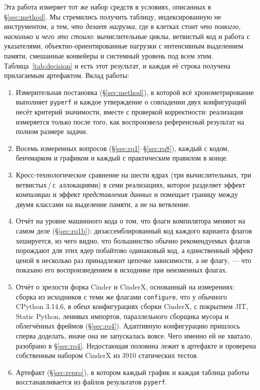 \documentclass[10pt,a4paper]{article}
\newcommand{\code}[1]{\texttt{\small #1}}
\begin{document}
Эта работа измеряет тот же набор средств в условиях, описанных в \S\ref{sec:method}. Мы
стремились получить таблицу, индексированную не инструментом, а тем, \emph{что делает нагрузка},
где в клетках стоит
\emph{что помогло, насколько и чего это стоило}: вычислительные циклы, ветвистый код и работа с
указателями, объектно-ориентированные нагрузки с интенсивным выделением памяти, смешанные
конвейеры и системный уровень под всем этим. Таблица~\ref{tab:decision} и есть этот результат, и
каждая её строка получена прилагаемым артефактом. Вклад работы:

\begin{enumerate}[leftmargin=1.4em,itemsep=1pt]
  \item Измерительная постановка (\S\ref{sec:method}), в которой всё хронометрирование выполняет
        \code{pyperf} и каждое утверждение о совпадении двух конфигураций несёт критерий
        значимости, вместе с проверкой корректности: реализация измеряется только после того,
        как воспроизвела референсный результат на полном размере задачи.
  \item Восемь измеренных вопросов (\S\ref{sec:rq1}--\S\ref{sec:rq8}), каждый с кодом, бенчмарком
        и графиком и каждый с практическим правилом в конце.
  \item Кросс-технологическое сравнение на шести ядрах (три вычислительных, три
        ветвистых\,/\,с~аллокациями) в семи реализациях, которое разделяет эффект
        \emph{компиляции} и эффект \emph{представления данных} и помещает границу между двумя
        классами на выделение памяти, а не на ветвление.
  \item Отчёт на уровне машинного кода о том, что флаги компилятора меняют на самом деле
        (\S\ref{sec:rq1b}): дизассемблированный код каждого варианта флагов хешируется, из чего
        видно, что большинство обычно рекомендуемых флагов порождают для этих ядер побайтово
        одинаковый код, а единственный эффект ценой в несколько раз принадлежит цепочке
        зависимости, а не флагу, --- что показано его воспроизведением в исходнике при неизменных
        флагах.
  \item Отчёт о зрелости форка Cinder и CinderX, основанный на измерениях: сборка из исходников с
        теми же флагами \code{configure}, что у обычного CPython 3.14.6, в \emph{обеих}
        конфигурациях сборки CinderX, с покрытием JIT, Static Python, ленивых импортов,
        параллельного сборщика мусора и облегчённых фреймов (\S\ref{sec:rq4}). Адаптивную
        конфигурацию пришлось сперва доделать, иначе она не запускалась вовсе. Чего именно ей не
        хватало, разобрано в \S\ref{sec:rq4}. Недостающая половина лежит
        в артефакте и проверена собственным набором CinderX из 3910 статических тестов.
  \item Артефакт (\S\ref{sec:repro}), в котором каждый график и каждая таблица работы
        восстанавливается из файлов результатов \code{pyperf}.
\end{enumerate}
\end{document}
